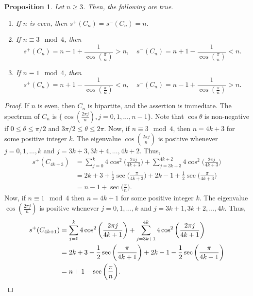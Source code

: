 \documentclass{article}
\newtheorem{proposition}{Proposition}[section]
\begin{document}
\begin{proposition}
Let $n\ge 3$. Then, the following are true.
\begin{enumerate}[$(i)$]
       \item If $n$ is even, then $s^+(C_n)=s^-(C_n)=n$.
       \item If $n\equiv 3 \mod 4$, then 
   \[ s^+(C_n) = n - 1 + \frac{1}{\cos(\frac{\pi}{n})}> n, \quad s^-(C_n) = n +1  - \frac{1}{\cos(\frac{\pi}{n})}< n.\]
       \item If $n\equiv 1 \mod 4$, then 
   \[ s^+(C_n) = n + 1 - \frac{1}{\cos(\frac{\pi}{n})}< n, \quad  s^-(C_n) = n - 1 + \frac{1}{\cos(\frac{\pi}{n})}> n.\]
\end{enumerate}
\end{proposition}

\begin{proof}
If $n$ is even, then $C_n$ is bipartite, and the assertion is immediate. The spectrum of $C_n$ is $\{\cos \left(\frac{2\pi j}{n}\right), j = 0, 1, \ldots, n-1\}$. Note that $\cos{\theta}$ is non-negative if $0\le\theta\le \pi/2$ and $3\pi/2 \le\theta\le 2\pi$. Now, if $n\equiv3 \mod 4$, then $n = 4k + 3$ for some positive integer $k$. The eigenvalue $\cos \left(\frac{2\pi j}{n}\right)$ is positive whenever $j = 0,1,\dots,k$ and $j = 3k+3,3k+4,\dots,4k+2$. Thus,  
   \begin{align*}
       s^+(C_{4k+3}) &= \sum_{j=0}^k 4\cos^2\bigg({\frac{2\pi j}{4k+3}}\bigg) + \sum_{j=3k+3}^{4k+2} 4\cos^2\bigg({\frac{2\pi j}{4k+3}}\bigg) \\
       &= 2k+3 +\frac{1}{2}\sec \bigg(\frac{\pi}{4k+3}\bigg) + 2k-1 + \frac{1}{2}\sec \bigg(\frac{\pi}{4k+3}\bigg) \\
       &= n-1 + \sec \bigg(\frac{\pi}{n}\bigg).
   \end{align*}
Now, if $n\equiv 1 \mod 4$ then $n = 4k + 1$ for some positive integer $k$. The eigenvalue $\cos \left(\frac{2\pi j}{n}\right)$ is positive whenever $j = 0,1,\dots,k$ and $j = 3k+1,3k+2,\dots,4k$. Thus,  
   \begin{align*}
       s^+(C_{4k+1}) &= \sum_{j=0}^k 4\cos^2\bigg({\frac{2\pi j}{4k+1}}\bigg) + \sum_{j=3k+1}^{4k} 4\cos^2\bigg({\frac{2\pi j}{4k+1}}\bigg) \\
       &= 2k+3 -\frac{1}{2}\sec \bigg(\frac{\pi}{4k+1}\bigg) + 2k-1 - \frac{1}{2}\sec \bigg(\frac{\pi}{4k+1}\bigg) \\
       &= n+1 - \sec \bigg(\frac{\pi}{n}\bigg). \qedhere
\end{align*}\end{proof}
\end{document}
